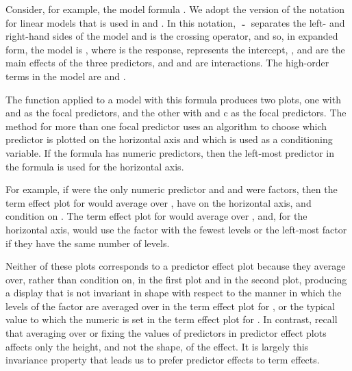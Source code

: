 \documentclass[article]{jss}
\newcommand{\tild}{\symbol{126}}
\newcommand{\Rtilde}{\,\raisebox{-.5ex}{\code{\tild{}}}\,}
\newcommand{\Rmod}[2]{\code{#1 \raisebox{-.5ex}{\tild{}} #2}}
\newcommand{\smsp}{\nobreak\hspace{.08333em plus .00333em}}
\newcommand{\acb}[2]{#1\smsp{}:\smsp{}#2}
\newcommand{\aab}[2]{#1\smsp{}*\smsp{}#2}
\begin{document}
Consider, for example, the model formula \Rmod{y}{\aab{a}{b} +
  \aab{a}{c}}. We adopt the version of the \cite{WilkinsonRogers73}
notation for linear models that is used in  and
 \citep{ChambersHastie92}. In this notation, $\Rtilde{}$
separates the left- and right-hand sides of the model and \code{*} is
the crossing operator, and so, in expanded form, the model is
\Rmod{y}{1 + a + b + c + \acb{a}{b} + \acb{a}{c}}, where  is
the response,  represents the intercept, , 
and  are the main effects of the three predictors, and
\code{\acb{a}{b}} and \code{\acb{a}{c}} are interactions. The
high-order terms in the model are \code{\acb{a}{b}} and
\code{\acb{a}{c}}.

The  function applied to a model with this formula
produces two plots, one with  and  as the focal
predictors, and the other with  and {c} as the focal
predictors.  The  method for more than one focal predictor
uses an algorithm to choose which predictor is plotted on the
horizontal axis and which is used as a conditioning variable. If the
formula has numeric predictors, then the left-most predictor in the
formula is used for the horizontal axis.

For example, if  were the only numeric predictor and  and  were factors, then the term effect plot for \code{\acb{a}{b}} would average over , have  on the horizontal axis, and condition on .  The term effect plot for \code{\acb{a}{c}} would average over , and, for the horizontal axis, would use the factor with the fewest levels or the left-most factor if they have the same number of levels.

Neither of these plots corresponds to a predictor effect plot because they average over, rather than condition on,  in the first plot and  in the second plot, producing a display that is not invariant in shape with respect to the manner in which the levels of the factor  are averaged over in the term effect plot for \code{\acb{a}{b}}, or the typical value to which the numeric  is set in the term effect plot for \code{\acb{a}{c}}. In contrast, recall that averaging over or fixing the values of predictors in predictor effect plots affects only the height, and not the shape, of the effect. It is largely this invariance property that leads us to prefer predictor effects to term effects.
\end{document}
